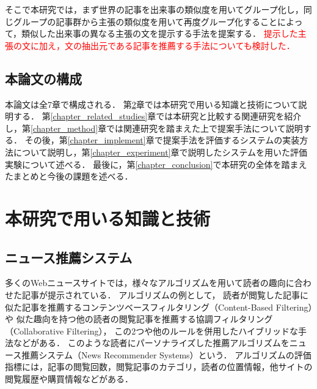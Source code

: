 \documentclass[12pt,a4j]{jreport}
\begin{document}


そこで本研究では，まず世界の記事を出来事の類似度を用いてグループ化し，同じグループの記事群から主張の類似度を用いて再度グループ化することによって，類似した出来事の異なる主張の文を提示する手法を提案する．
\textcolor{red}{提示した主張の文に加え，文の抽出元である記事を推薦する手法についても検討した．}



\section{本論文の構成}
本論文は全7章で構成される．
第\ref{chapter_knowledge_and_technologies}章では本研究で用いる知識と技術について説明する．
第\ref{chapter_related_studies}章では本研究と比較する関連研究を紹介し，第\ref{chapter_method}章では関連研究を踏まえた上で提案手法について説明する．
その後，第\ref{chapter_implement}章で提案手法を評価するシステムの実装方法について説明し，第\ref{chapter_experiment}章で説明したシステムを用いた評価実験について述べる．
最後に，第\ref{chapter_conclusion}で本研究の全体を踏まえたまとめと今後の課題を述べる．

\chapter{本研究で用いる知識と技術}
\label{chapter_knowledge_and_technologies}
\section{ニュース推薦システム}
多くのWebニュースサイトでは，様々なアルゴリズムを用いて読者の趣向に合わせた記事が提示されている．
アルゴリズムの例として，
読者が閲覧した記事に似た記事を推薦するコンテンツベースフィルタリング（Content-Based Filtering）や
似た趣向を持つ他の読者の閲覧記事を推薦する協調フィルタリング（Collaborative Filtering），
この2つや他のルールを併用したハイブリッドな手法などがある\cite{karimi_news_2018}．
このような読者にパーソナライズした推薦アルゴリズムをニュース推薦システム（News Recommender Systems）という．
アルゴリズムの評価指標には，記事の閲覧回数，閲覧記事のカテゴリ，読者の位置情報，他サイトの閲覧履歴や購買情報などがある．
\end{document}
